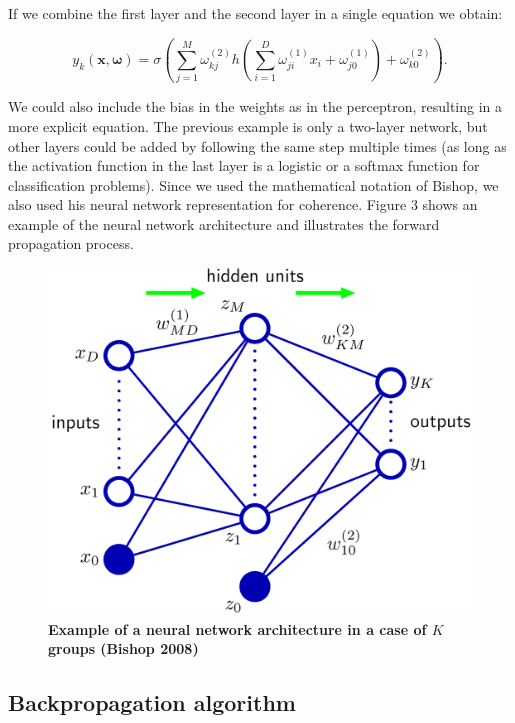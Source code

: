 \documentclass[a4paper,12pt]{article}
\numberwithin{equation}{section}
\begin{document}
If we combine the first layer and the second layer in a single equation we obtain:

\begin{equation}\label{eq:7}
y_k(\boldsymbol{x},\boldsymbol{\omega}) = \sigma ( \sum_{j=1}^{M} \omega_{kj}^{(2)} h(\sum_{i=1}^{D}\omega_{ji}^{(1)} x_i + \omega_{j0}^{(1)} ) + \omega_{k0}^{(2)}).
\end{equation}

We could also include the bias in the weights as in the perceptron, resulting in a more explicit equation. The previous example is only a two-layer network, but other layers could be added by following the same step multiple times (as long as the activation function in the last layer is a logistic or a softmax function for classification problems). Since we used the mathematical notation of Bishop, we also used his neural network representation for coherence. Figure 3 shows an example of the neural network architecture and illustrates the forward propagation process.

\begin{figure}[htb]%
    \begin{center}
    \includegraphics[scale = 1]{Figure1ANN.png}%
    \caption{\textbf{Example of a neural network architecture in a case of $K$ groups (Bishop 2008)}}
    \label{fig3:ANN architecture}%
    \end{center}
\end{figure}


\newpage
\subsection{Backpropagation algorithm}
\end{document}
